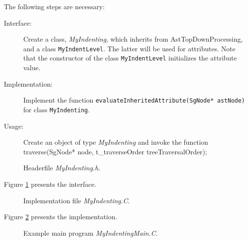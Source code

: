 The following steps are necessary:
\begin{description}
\item[Interface:] Create a class, {\em MyIndenting}, which inherits from AstTopDownProcessing, and a class {\tt MyIndentLevel}. The latter will be used for attributes. Note that the constructor of the class {\tt MyIndentLevel} initializes the attribute value.
\item[Implementation:] Implement the function {\tt evaluateInheritedAttribute(SgNode* astNode)} for class {\tt MyIndenting}.
\item[Usage:] Create an object of type {\em MyIndenting} and invoke the function traverse(SgNode* node, t\_traverseOrder treeTraversalOrder);
\end{description}

\begin{figure}
\begin{latexonly}
   
\end{latexonly}

\begin{htmlonly}
   
\end{htmlonly}
\caption{Headerfile {\em MyIndenting.h}.}
\label{AstProcessing:myvisitor4}
\end{figure}

Figure \ref{AstProcessing:myvisitor4} presents the interface.

\begin{figure}
\begin{latexonly}
   
\end{latexonly}

\begin{htmlonly}
   
\end{htmlonly}
\caption{Implementation file {\em MyIndenting.C}.}
\label{AstProcessing:myvisitor5}
\end{figure}

Figure \ref{AstProcessing:myvisitor5} presents the implementation.

\begin{figure}
\begin{latexonly}
   
\end{latexonly}

\begin{htmlonly}
   
\end{htmlonly}
\caption{Example main program {\em MyIndentingMain.C}.}
\label{AstProcessing:myvisitor6}
\end{figure}

